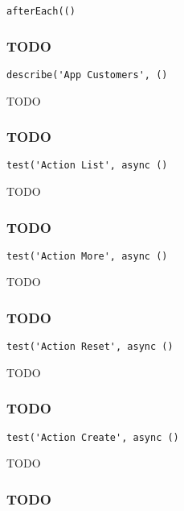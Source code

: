 \documentclass[a4paper]{article}
\begin{document}
\begin{lstlisting}
afterEach(()
\end{lstlisting}

\hypertarget{toc554}{}
\subsubsection{TODO}

\begin{lstlisting}
describe('App Customers', ()
\end{lstlisting}

TODO

\hypertarget{toc555}{}
\subsubsection{TODO}

\begin{lstlisting}
test('Action List', async ()
\end{lstlisting}

TODO

\hypertarget{toc556}{}
\subsubsection{TODO}

\begin{lstlisting}
test('Action More', async ()
\end{lstlisting}

TODO

\hypertarget{toc557}{}
\subsubsection{TODO}

\begin{lstlisting}
test('Action Reset', async ()
\end{lstlisting}

TODO

\hypertarget{toc558}{}
\subsubsection{TODO}

\begin{lstlisting}
test('Action Create', async ()
\end{lstlisting}

TODO

\hypertarget{toc559}{}
\subsubsection{TODO}
\end{document}
